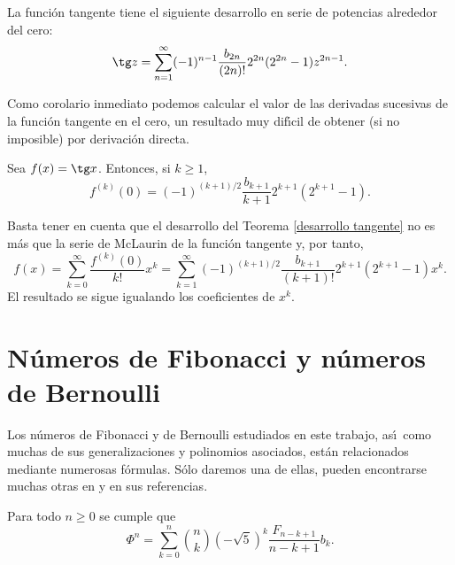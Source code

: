 \begin{teorema}\label{desarrollo tangente} La funci\'on tangente tiene el siguiente desarrollo en serie de potencias alrededor del cero:
$$\tg z=\sum_{n=1}^\infty (-1)^{n-1}\frac{b_{2n}}{(2n)!}2^{2n}(2^{2n}-1)z^{2n-1}.$$
\end{teorema}

Como corolario inmediato podemos calcular el valor de las derivadas sucesivas de la funci\'on tangente en el cero, un resultado muy dif\'\i cil de obtener (si no imposible) por derivaci\'on directa.

\begin{corolario} Sea $f(x)=\tg x$. Entonces, si $k\geq 1$,
$$f^{(k)}(0)=(-1)^{(k+1)/2}\frac{b_{k+1}}{k+1}2^{k+1}(2^{k+1}-1).$$
\end{corolario}

\begin{demostracion} Basta tener en cuenta que el desarrollo del Teorema \ref{desarrollo tangente} no es m\'as que la serie de McLaurin de la funci\'on tangente y, por tanto,
$$f(x)=\sum_{k=0}^\infty\frac{f^{(k)}(0)}{k!}x^k=
\sum_{k=1}^\infty (-1)^{(k+1)/2}\frac{b_{k+1}}{(k+1)!}2^{k+1}(2^{k+1}-1)x^k.$$
El resultado se sigue igualando los coeficientes de $x^k$.
\end{demostracion}

\section{N\'umeros de Fibonacci y n\'umeros de Bernoulli}

Los n\'umeros de Fibonacci y de Bernoulli estudiados en este trabajo, as\'\i\ como muchas de sus generalizaciones y polinomios asociados, est\'an relacionados mediante numerosas f\'ormulas. S\'olo daremos una de ellas, pueden encontrarse muchas otras en \cite{Byrd} y en sus referencias.

\begin{teorema} Para todo $n\geq 0$ se cumple que
$$\Phi^n=\sum_{k=0}^n {n\choose k}(-\sqrt 5)^k\frac{F_{n-k+1}}{n-k+1}b_k.$$
\end{teorema}

